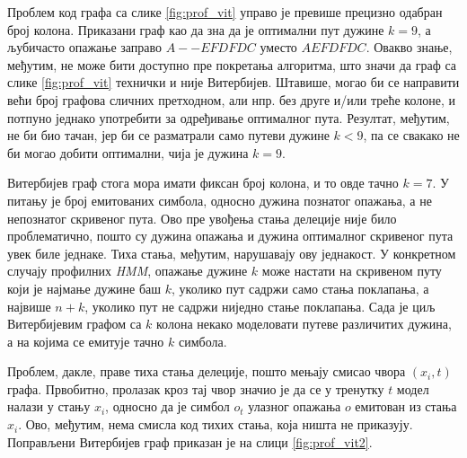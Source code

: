 \documentclass[12pt,oneside]{memoir}
\begin{document}
\begin{CJK}{UTF8}{ipxm}
Проблем код графа са слике \ref{fig:prof_vit} управо је превише прецизно одабран број колона. Приказани граф као да зна да је оптимални пут дужине $k = 9$, а љубичасто опажање заправо $A--EFDFDC$ уместо $AEFDFDC$. Овакво знање, међутим, не може бити доступно пре покретања алгоритма, што значи да граф са слике \ref{fig:prof_vit} технички и није Витербијев. Штавише, могао би се направити већи број графова сличних претходном, али нпр. без друге и/или треће колоне, и потпуно једнако употребити за одређивање оптималног пута. Резултат, међутим, не би био тачан, јер би се разматрали само путеви дужине $k < 9$, па се свакако не би могао добити оптимални, чија је дужина $k = 9$.

Витербијев граф стога мора имати фиксан број колона, и то овде тачно $k = 7$. У питању је број емитованих симбола, односно дужина познатог опажања, а не непознатог скривеног пута. Ово пре увођења стања делеције није било проблематично, пошто су дужина опажања и дужина оптималног скривеног пута увек биле једнаке. Тиха стања, међутим, нарушавају ову једнакост. У конкретном случају профилних \textit{HMM}, опажање дужине $k$ може настати на скривеном путу који је најмање дужине баш $k$, уколико пут садржи само стања поклапања, а највише $n+k$, уколико пут не садржи ниједно стање поклапања. Сада је циљ Витербијевим графом са $k$ колона некако моделовати путеве различитих дужина, а на којима се емитује тачно $k$ симбола.

Проблем, дакле, праве тиха стања делеције, пошто мењају смисао чвора $(x_i, t)$ графа. Првобитно, пролазак кроз тај чвор значио је да се у тренутку $t$ модел налази у стању $x_i$, односно да је симбол $o_t$ улазног опажања $o$ емитован из стања $x_i$. Ово, међутим, нема смисла код тихих стања, која ништа не приказују. Поправљени Витербијев граф приказан је на слици \ref{fig:prof_vit2}.


\end{CJK}
\end{document}
